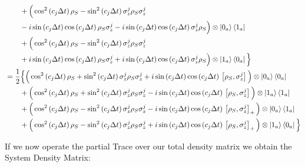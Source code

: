 \documentclass[a4paper,12pt]{article}
\begin{document}
\begin{align*}
		& \qquad  + \Big( \cos^{2}{\left( c_j \Delta t \right)} \, \rho_S - \sin^{2}{\left( c_j \Delta t \right)} \, \sigma_{z}^{j}\rho_S\sigma_{z}^{j} \\
		& \qquad - i \sin{\left( c_j \Delta t \right)}\cos{\left( c_j \Delta t \right)} \, \rho_S \sigma_{z}^{j} - i \sin{\left( c_j \Delta t \right)}\cos{\left( c_j \Delta t \right)} \, \sigma_{z}^{j} \rho_S \Big) \otimes \ket{0_a}\bra{1_a} \\
		& \qquad  + \Big( \cos^{2}{\left( c_j \Delta t \right)} \, \rho_S - \sin^{2}{\left( c_j \Delta t \right)} \, \sigma_{z}^{j}\rho_S\sigma_{z}^{j} \\
		& \qquad + i \sin{\left( c_j \Delta t \right)}\cos{\left( c_j \Delta t \right)} \, \rho_S \sigma_{z}^{j} + i \sin{\left( c_j \Delta t \right)}\cos{\left( c_j \Delta t \right)} \, \sigma_{z}^{j} \rho_S \Big) \otimes \ket{1_a}\bra{0_a} \Big\} \\
		& = \frac{1}{2} \Big\{ \Big( \cos^{2}{\left( c_j \Delta t \right)} \, \rho_S + \sin^{2}{\left( c_j \Delta t \right)} \, \sigma_{z}^{j}\rho_S\sigma_{z}^{j} 
		+i \sin{\left( c_j \Delta t \right)}\cos{\left( c_j \Delta t \right)} \, \left[ \rho_S, \sigma_{z}^{j} \right] \Big) \otimes \ket{0_a}\bra{0_a} \\
		& \qquad  + \Big( \cos^{2}{\left( c_j \Delta t \right)} \, \rho_S + \sin^{2}{\left( c_j \Delta t \right)} \, \sigma_{z}^{j}\rho_S\sigma_{z}^{j} 
		-i \sin{\left( c_j \Delta t \right)}\cos{\left( c_j \Delta t \right)} \, \left[ \rho_S, \sigma_{z}^{j} \right] \Big) \otimes \ket{1_a}\bra{1_a} \\
		& \qquad  + \Big( \cos^{2}{\left( c_j \Delta t \right)} \, \rho_S - \sin^{2}{\left( c_j \Delta t \right)} \, \sigma_{z}^{j}\rho_S\sigma_{z}^{j} 
		-i \sin{\left( c_j \Delta t \right)}\cos{\left( c_j \Delta t \right)} \, \left[ \rho_S, \sigma_{z}^{j} \right]_{+} \Big) \otimes \ket{0_a}\bra{1_a} \\
		& \qquad  + \Big( \cos^{2}{\left( c_j \Delta t \right)} \, \rho_S - \sin^{2}{\left( c_j \Delta t \right)} \, \sigma_{z}^{j}\rho_S\sigma_{z}^{j} 
		+i \sin{\left( c_j \Delta t \right)}\cos{\left( c_j \Delta t \right)} \, \left[ \rho_S, \sigma_{z}^{j} \right]_{+} \Big) \otimes \ket{1_a}\bra{0_a} \Big\}
	\end{align*}

	\clearpage
	\newpage
	
	\begin{flushleft}
		If we now operate the partial Trace over our total density matrix we obtain the System Density Matrix:
	\end{flushleft}
	
\end{document}

